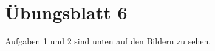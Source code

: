 \documentclass[12pt,a4paper,headsepline]{scrreprt}
\begin{document}
\section*{Übungsblatt 6}
Aufgaben 1 und 2 sind unten auf den Bildern zu sehen.



\end{document}
